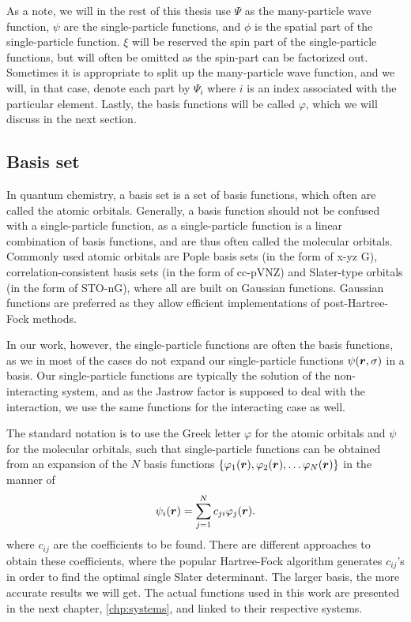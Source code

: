 As a note, we will in the rest of this thesis use $\Psi$ as the many-particle wave function, $\psi$ are the single-particle functions, and $\phi$ is the spatial part of the single-particle function. $\xi$ will be reserved the spin part of the single-particle functions, but will often be omitted as the spin-part can be factorized out. Sometimes it is appropriate to split up the many-particle wave function, and we will, in that case, denote each part by $\Psi_i$ where $i$ is an index associated with the particular element. Lastly, the basis functions will be called $\varphi$, which we will discuss in the next section. 

\subsection{Basis set} \label{sec:basisset}
In quantum chemistry, a basis set is a set of basis functions, which often are called the atomic orbitals.  Generally, a basis function should not be confused with a single-particle function, as a single-particle function is a linear combination of basis functions, and are thus often called the molecular orbitals. Commonly used atomic orbitals are Pople basis sets (in the form of x-yz G), correlation-consistent basis sets (in the form of cc-pVNZ) and Slater-type orbitals (in the form of STO-nG), where all are built on Gaussian functions. Gaussian functions are preferred as they allow efficient implementations of post-Hartree-Fock methods.

In our work, however, the single-particle functions are often the basis functions, as we in most of the cases do not expand our single-particle functions $\psi(\boldsymbol{{r}},\sigma)$ in a basis. Our single-particle functions are typically the solution of the non-interacting system, and as the Jastrow factor is supposed to deal with the interaction, we use the same functions for the interacting case as well.

The standard notation is to use the Greek letter $\varphi$ for the atomic orbitals and $\psi$ for the molecular orbitals, such that single-particle functions can be obtained from an expansion of the $N$ basis functions $\{\varphi_1(\boldsymbol{{r}}),\varphi_2(\boldsymbol{{r}}),\hdots\varphi_N(\boldsymbol{{r}})\}$ in the manner of
\begin{equation}
\psi_i(\boldsymbol{{r}})=\sum_{j=1}^Nc_{ji}\varphi_j(\boldsymbol{{r}}).
\end{equation}
where $c_{ij}$ are the coefficients to be found. There are different approaches to obtain these coefficients, where the popular Hartree-Fock algorithm generates $c_{ij}$'s in order to find the optimal single Slater determinant. The larger basis, the more accurate results we will get. The actual functions used in this work are presented in the next chapter, \ref{chp:systems}, and linked to their respective systems. 

